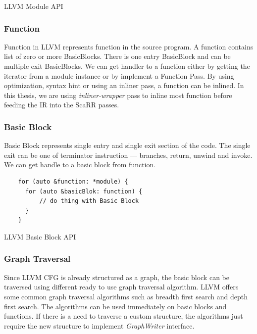 \begin{listing}
\inputminted[]{cpp}{code/module.cpp}
\caption{LLVM Module API}    
\label{listing:2-5}
\end{listing}

\subsubsection{Function}

Function in LLVM represents function in the source program. A function contains list of zero or more BasicBlocks. There is one entry BasicBlock and can be multiple exit BasicBlocks. We can get handler to a function either by getting the iterator from a module instance or by implement a Function Pass. By using optimization, syntax hint or using an inliner pass, a function can be inlined. In this thesis, we are using \emph{inliner-wrapper} pass to inline most function before feeding the IR into the ScaRR passes.

\subsubsection{Basic Block}

Basic Block represents single entry and single exit section of the code. The single exit can be one of terminator instruction — branches, return, unwind and invoke. We can get handle to a basic block from function. 

\begin{listing}
\begin{verbatim}
    for (auto &function: *module) {
      for (auto &basicBlok: function) {
          // do thing with Basic Block
      }
    }
\end{verbatim}
\caption{LLVM Basic Block API}    
\label{listing:2-6}
\end{listing}

\subsubsection{Graph Traversal}

Since LLVM CFG is already structured as a graph, the basic block can be traversed using different ready to use graph traversal algorithm. LLVM offers some common graph traversal algorithms such as breadth first search and depth first search. The algorithms can be used immediately on basic blocks and functions. If there is a need to traverse a custom structure, the algorithms just require the new structure to implement \emph{GraphWriter} interface.

